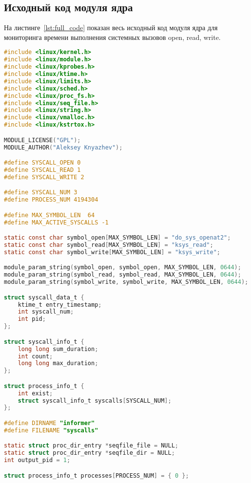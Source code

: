 \begin{appendices}
	\chapter{Исходный код модуля ядра}
	
	На листинге~\ref{lst:full_code} показан весь исходный код модуля ядра для мониторинга времени выполнения системных вызовов open, read, write.
	
\begin{lstlisting}[language=C, label=lst:full_code, caption={Код модуля ядра для мониторинга системных вызовов open, read, close}]
#include <linux/kernel.h>
#include <linux/module.h>
#include <linux/kprobes.h>
#include <linux/ktime.h>
#include <linux/limits.h>
#include <linux/sched.h>
#include <linux/proc_fs.h>
#include <linux/seq_file.h>
#include <linux/string.h>
#include <linux/vmalloc.h>
#include <linux/kstrtox.h>

MODULE_LICENSE("GPL");
MODULE_AUTHOR("Aleksey Knyazhev");

#define SYSCALL_OPEN 0
#define SYSCALL_READ 1
#define SYSCALL_WRITE 2

#define SYSCALL_NUM 3
#define PROCESS_NUM 4194304

#define MAX_SYMBOL_LEN	64
#define MAX_ACTIVE_SYSCALLS -1

static const char symbol_open[MAX_SYMBOL_LEN] = "do_sys_openat2";
static const char symbol_read[MAX_SYMBOL_LEN] = "ksys_read";
static const char symbol_write[MAX_SYMBOL_LEN] = "ksys_write";

module_param_string(symbol_open, symbol_open, MAX_SYMBOL_LEN, 0644);
module_param_string(symbol_read, symbol_read, MAX_SYMBOL_LEN, 0644);
module_param_string(symbol_write, symbol_write, MAX_SYMBOL_LEN, 0644);

struct syscall_data_t {
    ktime_t entry_timestamp;
    int syscall_num;
    int pid;
};

struct syscall_info_t {
    long long sum_duration;
    int count;
    long long max_duration;
};

struct process_info_t {
    int exist;
    struct syscall_info_t syscalls[SYSCALL_NUM];
};

#define DIRNAME "informer"
#define FILENAME "syscalls"

static struct proc_dir_entry *seqfile_file = NULL;
static struct proc_dir_entry *seqfile_dir = NULL;
int output_pid = 1;

struct process_info_t processes[PROCESS_NUM] = { 0 };


\end{lstlisting}
\end{appendices}
